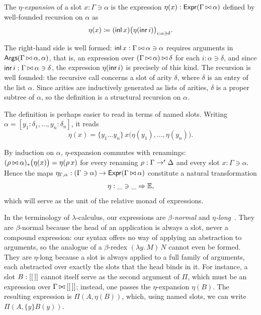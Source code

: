 \begin{definition}\label{eta-expansion}
    The \emph{$\eta$-expansion} of a slot $x : \Gamma \ni \alpha$ is the expression $\eta(x) : \mathsf{Expr}(\Gamma \mathbin{\bowtie} \alpha)$ defined by well-founded recursion on $\alpha$ as
    \[
    \eta(x) \coloneqq (\mathsf{inl}\, x)\big(\eta(\mathsf{inr}\, i)\big)_{i : \alpha \ni \delta}.
    \]
\end{definition}

The right-hand side is well formed: $\mathsf{inl}\, x : \Gamma \mathbin{\bowtie} \alpha \ni \alpha$ requires arguments in $\mathsf{Args}(\Gamma \mathbin{\bowtie} \alpha, \alpha)$, that is, an expression over $(\Gamma \mathbin{\bowtie} \alpha) \mathbin{\bowtie} \delta$ for each $i : \alpha \ni \delta$, and since $\mathsf{inr}\, i : \Gamma \mathbin{\bowtie} \alpha \ni \delta$, the expression $\eta(\mathsf{inr}\, i)$ is precisely of this kind.
The recursion is well founded: the recursive call concerns a slot of arity $\delta$, where $\delta$ is an entry of the list $\alpha$. Since arities are inductively generated as lists of arities, $\delta$ is a proper subtree of $\alpha$, so the definition is a structural recursion on $\alpha$.

The definition is perhaps easier to read in terms of named slots. Writing $\alpha = [y_1 : \delta_1, \ldots, y_n : \delta_n]$, it reads
\[
\eta(x) = \{y_1 \ldots y_n\}\, x\big(\eta(y_1), \ldots, \eta(y_n)\big).
\]

By induction on $\alpha$, $\eta$-expansion commutes with renamings: $(\rho \mathbin{\bowtie} \alpha)_*\big(\eta(x)\big) = \eta(\rho\, x)$ for every renaming $\rho : \Gamma \to^{\mathsf{r}} \Delta$ and every slot $x : \Gamma \ni \alpha$. Hence the maps $\eta_{\Gamma, \alpha} : (\Gamma \ni \alpha) \to \mathsf{Expr}(\Gamma \mathbin{\bowtie} \alpha)$ constitute a natural transformation
\[
\eta : \_ \ni \_ \Rightarrow \mathbb{E},
\]
which will serve as the unit of the relative monad of expressions.

\begin{remark}\label{rem:normal-forms}
    In the terminology of $\lambda$-calculus, our expressions are \emph{$\beta$-normal} and \emph{$\eta$-long}~\cite[\S2]{HarperLicata2007}. They are $\beta$-normal because the head of an application is always a slot, never a compound expression: our syntax offers no way of applying an abstraction to arguments, so the analogue of a $\beta$-redex $(\lambda y.\, M)\, N$ cannot even be formed. They are $\eta$-long because a slot is always applied to a full family of arguments, each abstracted over exactly the slots that the head binds in it.
    For instance, a slot $B : [\left[\,\right]]$ cannot itself serve as the second argument of $\Pi$, which must be an expression over $\Gamma \mathbin{\bowtie} [\left[\,\right]]$; instead, one passes the $\eta$-expansion $\eta(B)$. The resulting expression is $\Pi(A, \eta(B))$, which, using named slots, we can write $\Pi(A, \{y\}B(y))$.
\end{remark}

